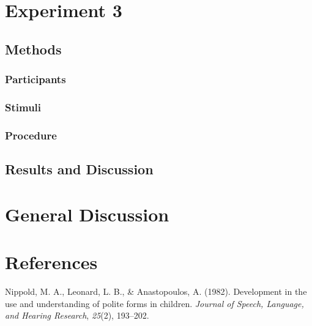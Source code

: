 \documentclass[10pt, letterpaper]{article}
\begin{document}
\section{Experiment 3}\label{experiment-3}

\subsection{Methods}\label{methods-2}

\subsubsection{Participants}\label{participants-2}

\subsubsection{Stimuli}\label{stimuli-2}

\subsubsection{Procedure}\label{procedure-2}

\subsection{Results and Discussion}\label{results-and-discussion-2}

\section{General Discussion}\label{general-discussion}

\section{References}\label{references}

\setlength{\parindent}{-0.1in} \setlength{\leftskip}{0.125in} \noindent

\hypertarget{refs}{}
\hypertarget{ref-nippold1982}{}
Nippold, M. A., Leonard, L. B., \& Anastopoulos, A. (1982). Development
in the use and understanding of polite forms in children. \emph{Journal
of Speech, Language, and Hearing Research}, \emph{25}(2), 193--202.
\end{document}
